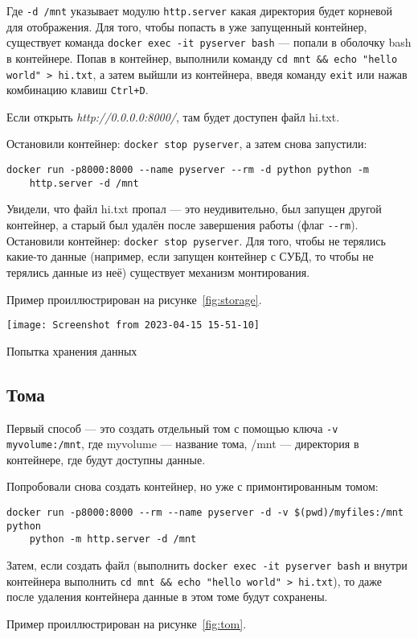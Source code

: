 Где \texttt{-d /mnt} указывает модулю
\texttt{http.server} какая директория будет корневой для отображения.
Для того, чтобы попасть в уже запущенный контейнер,
существует команда \texttt{docker exec -it pyserver bash} --- попали
в оболочку bash в контейнере. Попав в контейнер, выполнили команду
\verb|cd mnt && echo "hello world" > hi.txt|, а затем выйшли из контейнера,
введя команду \texttt{exit} или нажав комбинацию клавиш \texttt{Ctrl+D}.\par
Если открыть \textit{http://0.0.0.0:8000/},
там будет доступен файл hi.txt.\par
Остановили контейнер: \texttt{docker stop pyserver}, а затем снова запустили:

\begin{verbatim}
docker run -p8000:8000 --name pyserver --rm -d python python -m
	http.server -d /mnt
\end{verbatim}

Увидели, что файл hi.txt пропал --- это неудивительно, был запущен
другой контейнер, а старый был удалён после завершения работы
(флаг \verb|--rm|).
Остановили контейнер: \texttt{docker stop pyserver}.
Для того, чтобы не терялись какие-то данные
(например, если запущен контейнер с СУБД, то чтобы
не терялись данные из неё) существует механизм монтирования.\par
Пример проиллюстрирован на рисунке~\ref{fig:storage}.

\begin{image}
	\texttt{[image: Screenshot from 2023-04-15 15-51-10]}
	\caption{Попытка хранения данных}
	\label{fig:storage}
\end{image}

\subsection{Тома}
Первый способ --- это создать отдельный том с помощью ключа
\texttt{-v myvolume:/mnt}, где myvolume --- название тома,
/mnt --- директория в контейнере, где будут доступны данные.\par
Попробовали снова создать контейнер, но уже с примонтированным томом:

\begin{verbatim}
docker run -p8000:8000 --rm --name pyserver -d -v $(pwd)/myfiles:/mnt python
	python -m http.server -d /mnt
\end{verbatim}

Затем, если создать файл (выполнить \texttt{docker exec -it pyserver bash}
и внутри контейнера выполнить \verb|cd mnt && echo "hello world" > hi.txt|),
то даже после удаления контейнера данные в этом томе будут сохранены.\par
Пример проиллюстрирован на рисунке~\ref{fig:tom}.

